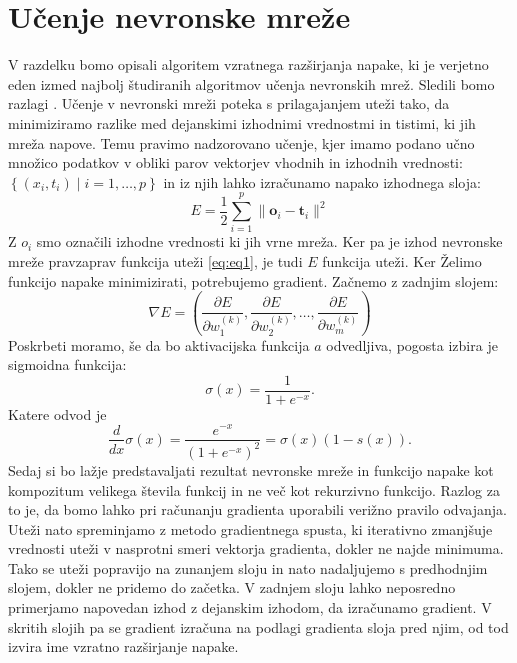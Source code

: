 \section{Učenje nevronske mreže}
V razdelku bomo opisali algoritem vzratnega razširjanja napake, ki je verjetno eden izmed najbolj študiranih algoritmov učenja nevronskih mrež. Sledili bomo razlagi \cite{rojas1996backpropagation}.
Učenje v nevronski mreži poteka s prilagajanjem uteži tako, da minimiziramo razlike med dejanskimi izhodnimi vrednostmi in tistimi, ki jih mreža napove. Temu pravimo nadzorovano učenje, kjer imamo podano učno množico podatkov v obliki parov vektorjev vhodnih in izhodnih vrednosti: $\left\{ (x_i, t_i) \mid i = 1, \ldots, p \right\}$ in iz njih lahko izračunamo napako izhodnega sloja: 
\begin{equation}
    E = \frac{1}{2} \sum_{i=1}^{p} \|\mathbf{o}_i - \mathbf{t}_i\|^2 
\end{equation}
Z $o_{i}$ smo označili izhodne vrednosti ki jih vrne mreža. Ker pa je izhod nevronske mreže pravzaprav funkcija uteži \ref{eq:eq1}, je tudi $E$ funkcija uteži. Ker Želimo funkcijo napake minimizirati, potrebujemo gradient. Začnemo z zadnjim slojem: 
\begin{equation}
    \nabla E = \left( \frac{\partial E}{\partial w^{(k)}_1}, \frac{\partial E}{\partial w^{(k)}_2}, \ldots, \frac{\partial E}{\partial w^{(k)}_m} \right)
\end{equation}
Poskrbeti moramo, še da bo aktivacijska funkcija $a$ odvedljiva, pogosta izbira je sigmoidna funkcija:
\begin{equation}
    \sigma(x) = \frac{1}{1 + e^{-x}}.
\end{equation}
Katere odvod je
\begin{equation}
    \frac{d}{dx}\sigma(x) = \frac{e^{-x}}{\left(1+e^{-x}\right)^2} = \sigma(x)\left(1 - s(x)\right).
\end{equation}
Sedaj si bo lažje predstavaljati rezultat nevronske mreže in funkcijo napake kot kompozitum velikega števila funkcij in ne več kot rekurzivno funkcijo. Razlog za to je, da bomo lahko pri računanju gradienta uporabili verižno pravilo odvajanja. Uteži nato spreminjamo z metodo gradientnega spusta, ki iterativno zmanjšuje vrednosti uteži v nasprotni smeri vektorja gradienta, dokler ne najde minimuma. Tako se uteži popravijo na zunanjem sloju in nato nadaljujemo s predhodnjim slojem, dokler ne pridemo do začetka. V zadnjem sloju lahko neposredno primerjamo napovedan izhod z dejanskim izhodom, da izračunamo gradient. V skritih slojih pa se gradient izračuna na podlagi gradienta sloja pred njim, od tod izvira ime vzratno razširjanje napake.


